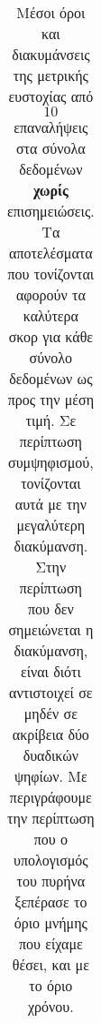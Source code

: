 \begin{table}[]
\begin{adjustbox}{angle=90}
{{\begin{tabular}{|l|c|c|c|c|c|c|}
\end{tabular}
}
}
\end{adjustbox}
\caption[Μέσοι όροι και διακυμάνσεις της μετρικής ευστοχίας από $10$ επαναλήψεις   στα σύνολα δεδομένων χωρίς επισημειώσεις.]{\small Μέσοι όροι και διακυμάνσεις της μετρικής ευστοχίας από $10$ επαναλήψεις   στα σύνολα δεδομένων \textbf{χωρίς} επισημειώσεις. Τα αποτελέσματα που τονίζονται αφορούν τα καλύτερα σκορ για κάθε σύνολο δεδομένων ως προς την μέση τιμή. Σε περίπτωση συμψηφισμού, τονίζονται αυτά με την μεγαλύτερη διακύμανση. Στην περίπτωση που δεν σημειώνεται η διακύμανση, είναι διότι αντιστοιχεί σε μηδέν σε ακρίβεια δύο δυαδικών ψηφίων. Με  περιγράφουμε την περίπτωση που ο υπολογισμός του πυρήνα ξεπέρασε το όριο μνήμης που είχαμε θέσει, και με  το όριο χρόνου.}
\label{tab:acc:unlabelled}
\end{table}


